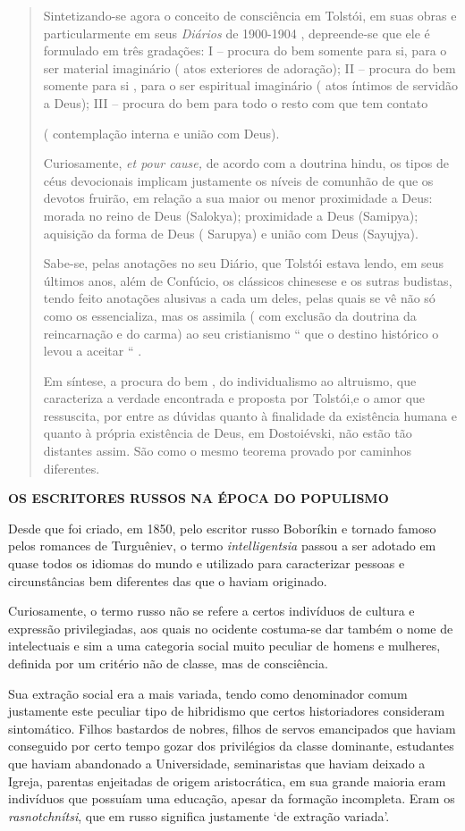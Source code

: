 \begin{quote}
Sintetizando-se agora o conceito de consciência em Tolstói, em suas
obras e particularmente em seus \emph{Diários} de 1900-1904 ,
depreende-se que ele é formulado em três gradações: I -- procura do bem
somente para si, para o ser material imaginário ( atos exteriores de
adoração); II -- procura do bem somente para si , para o ser espiritual
imaginário ( atos íntimos de servidão a Deus); III -- procura do bem
para todo o resto com que tem contato

( contemplação interna e união com Deus).

Curiosamente, \emph{et pour cause,} de acordo com a doutrina hindu, os
tipos de céus devocionais implicam justamente os níveis de comunhão de
que os devotos fruirão, em relação a sua maior ou menor proximidade a
Deus: morada no reino de Deus (Salokya); proximidade a Deus (Samipya);
aquisição da forma de Deus ( Sarupya) e união com Deus (Sayujya).

Sabe-se, pelas anotações no seu Diário, que Tolstói estava lendo, em
seus últimos anos, além de Confúcio, os clássicos chinesese e os sutras
budistas, tendo feito anotações alusivas a cada um deles, pelas quais se
vê não só como os essencializa, mas os assimila ( com exclusão da
doutrina da reincarnação e do carma) ao seu cristianismo `` que o
destino histórico o levou a aceitar `` .

Em síntese, a procura do bem , do individualismo ao altruismo, que
caracteriza a verdade encontrada e proposta por Tolstói,e o amor que
ressuscita, por entre as dúvidas quanto à finalidade da existência
humana e quanto à própria existência de Deus, em Dostoiévski, não estão
tão distantes assim. São como o mesmo teorema provado por caminhos
diferentes.
\end{quote}

\textbf{OS ESCRITORES RUSSOS NA ÉPOCA DO POPULISMO}

Desde que foi criado, em 1850, pelo escritor russo Boboríkin e tornado
famoso pelos romances de Turguêniev, o termo \emph{intelligentsia}
passou a ser adotado em quase todos os idiomas do mundo e utilizado para
caracterizar pessoas e circunstâncias bem diferentes das que o haviam
originado.

Curiosamente, o termo russo não se refere a certos indivíduos de cultura
e expressão privilegiadas, aos quais no ocidente costuma-se dar também o
nome de intelectuais e sim a uma categoria social muito peculiar de
homens e mulheres, definida por um critério não de classe, mas de
consciência.

Sua extração social era a mais variada, tendo como denominador comum
justamente este peculiar tipo de hibridismo que certos historiadores
consideram sintomático. Filhos bastardos de nobres, filhos de servos
emancipados que haviam conseguido por certo tempo gozar dos privilégios
da classe dominante, estudantes que haviam abandonado a Universidade,
seminaristas que haviam deixado a Igreja, parentas enjeitadas de origem
aristocrática, em sua grande maioria eram indivíduos que possuíam uma
educação, apesar da formação incompleta. Eram os \emph{rasnotchnítsi},
que em russo significa justamente `de extração variada'.

